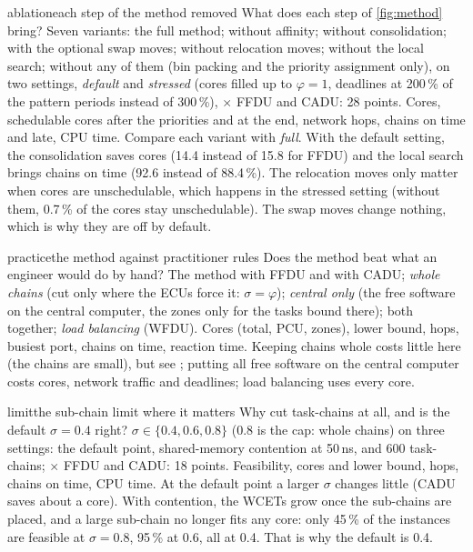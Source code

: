 \begin{experimentbox}{ablation}{each step of the method removed}
 What does each step of \cref{fig:method} bring?
 Seven variants: the full method; without affinity;
without consolidation; with the optional swap moves; without relocation moves;
without the local search; without any of them (bin packing and the
priority assignment only), on two settings, \emph{default} and
\emph{stressed} (cores filled up to $\varphi = 1$, deadlines at 200\,\% of
the pattern periods instead of 300\,\%), $\times$ FFDU and CADU: 28
points.
 Cores, schedulable cores after the priorities and at
the end, network hops, chains on time and late, CPU time.
 Compare each variant with \emph{full}. With the default
setting, the consolidation saves cores (14.4 instead of 15.8 for FFDU) and
the local search brings chains on time (92.6 instead of 88.4\,\%). The
relocation moves only matter when cores are unschedulable, which happens
in the stressed setting (without them, 0.7\,\% of the cores stay
unschedulable). The swap moves change nothing, which is why they are off
by default.
\end{experimentbox}

\begin{experimentbox}{practice}{the method against practitioner rules}
 Does the method beat what an engineer would do by
hand?
 The method with FFDU and with CADU; \emph{whole chains}
(cut only where the ECUs force it: $\sigma = \varphi$); \emph{central
only} (the free software on the central computer, the zones only for the
tasks bound there); both together; \emph{load balancing} (WFDU).
 Cores (total, PCU, zones), lower bound, hops, busiest
port, chains on time, reaction time.
 Keeping chains whole costs little here (the chains are
small), but see ; putting all free software on the central
computer costs cores, network traffic and deadlines; load balancing uses
every core.
\end{experimentbox}

\begin{experimentbox}{limit}{the sub-chain limit where it matters}
 Why cut task-chains at all, and is the default
$\sigma = 0.4$ right?
 $\sigma \in \{0.4, 0.6, 0.8\}$ (0.8 is the cap: whole
chains) on three settings: the default point, shared-memory contention at
50\,ns, and 600 task-chains; $\times$ FFDU and CADU: 18 points.
 Feasibility, cores and lower bound, hops, chains on
time, CPU time.
 At the default point a larger $\sigma$ changes little
(CADU saves about a core). With contention, the WCETs grow once the
sub-chains are placed, and a large sub-chain no longer fits any core:
only 45\,\% of the instances are feasible at $\sigma = 0.8$, 95\,\% at
0.6, all at 0.4. That is why the default is 0.4.
\end{experimentbox}

